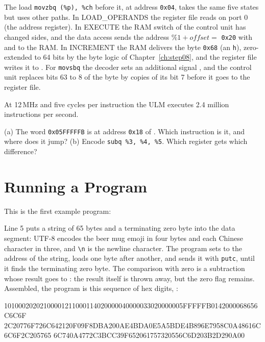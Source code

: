 The load \texttt{movzbq (\%p), \%ch} before it, at address \texttt{0x04},
takes the same five states but uses other paths. In LOAD\_OPERANDS the
register file reads  on port 0 (the address register). In EXECUTE the
RAM switch of the control unit has changed sides, and the data access sends
the address $\%1 + \mathit{offset} = $ \texttt{0x20} with  and
 to the RAM. In INCREMENT the RAM delivers the byte
\texttt{0x68} (an \texttt{h}), zero-extended to 64 bits by the byte logic of
Chapter~\ref{ch:step08}, and the register file writes it to . For
\texttt{movsbq} the decoder sets an additional signal ,
and the control unit replaces bits 63 to 8 of the byte by copies of its bit 7
before it goes to the register file.

At 12\,MHz and five cycles per instruction the ULM executes 2.4 million
instructions per second.

\begin{exercise}
\label{ex:step09-encode}
(a) The word \texttt{0x05FFFFFB} is at address \texttt{0x18} of
. Which instruction is it, and where does it jump? (b)
Encode \texttt{subq \%3, \%4, \%5}. Which register gets which difference?
\end{exercise}

\section{Running a Program}
\label{sec:step09-run}

This is the first example program:


Line 5 puts a string of 65 bytes and a terminating zero byte into the data
segment: UTF-8 encodes the beer mug emoji in four bytes and each Chinese
character in three, and \texttt{\textbackslash n} is the newline character. The program sets
 to the address of the string, loads one byte after another, and sends
it with \texttt{putc}, until it finds the terminating zero byte. The
comparison with zero is a subtraction whose result goes to : the result
itself is thrown away, but the zero flag remains. Assembled, the program is
this sequence of hex digits, :

\begin{terminal}
10100020202100001211000114020000040000033020000005FFFFFB0142000068656C6C6F
2C20776F726C642120F09F8DBA200AE4BDA0E5A5BDE4B896E7958C0A48616C6C6F2C205765
6C740A4772C3BCC39F652061757320556C6D203B2D290A00
\end{terminal}

